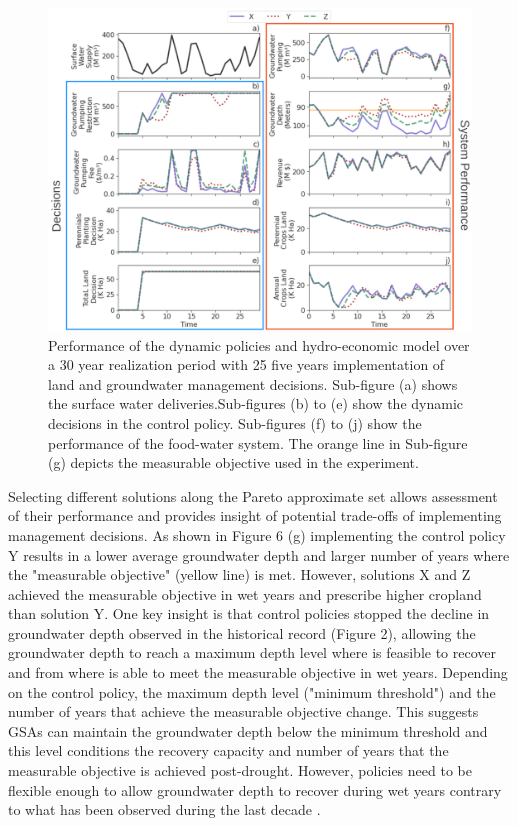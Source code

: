 \documentclass[a4paper,fleqn]{cas-sc}
\begin{document}
\begin{figure}[ht]
    \centering
    \includegraphics[width=1\textwidth,center]{selected_policies_performance_labels.png}
    \caption{Performance of the dynamic policies and hydro-economic model over a 30 year realization period with 25 five years implementation of land and groundwater management decisions. Sub-figure (a) shows the surface water deliveries.Sub-figures (b) to (e) show the dynamic decisions in the control policy. Sub-figures (f) to (j) show the performance of the food-water system. The orange line in Sub-figure (g) depicts the measurable objective used in the experiment.} \label{fig:parallel_robustness}
\end{figure}

Selecting different solutions along the Pareto approximate set allows assessment of their performance and provides insight of potential trade-offs of implementing management decisions. As shown in Figure 6 (g) implementing the control policy Y results in a lower average groundwater depth and larger number of years where the "measurable objective" (yellow line) is met. However, solutions X and Z achieved the measurable objective in wet years and prescribe higher cropland than solution Y. One key insight is that control policies stopped the decline in groundwater depth observed in the historical record (Figure 2), allowing the groundwater depth to reach a maximum depth level where is feasible to recover and from where is able to meet the measurable objective in wet years. Depending on the control policy, the maximum depth level ("minimum threshold") and the number of years that achieve the measurable objective change. This suggests GSAs can maintain the groundwater depth below the minimum threshold and this level conditions the recovery capacity and number of years that the measurable objective is achieved post-drought. However, policies need to be flexible enough to allow groundwater depth to recover during wet years contrary to what has been observed during the last decade \citep{liu_groundwater_2022,alam_post-drought_2021}.
\end{document}
